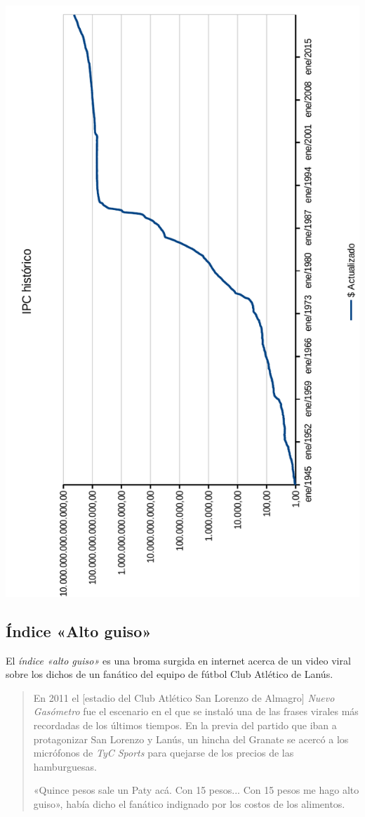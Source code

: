 \documentclass[12pt,a4paper,twoside]{book}
\begin{document}
\begin{center}
\includegraphics[scale=0.975]{img/ipc-historico.pdf}
\end{center}
\newpage

\subsection{Índice «Alto guiso»}
El \textit{índice «alto guiso»} es una broma surgida en internet acerca de un video viral sobre los dichos de un fanático del equipo de fútbol Club Atlético de Lanús.

\begin{quotation}
En 2011 el [estadio del Club Atlético San Lorenzo de Almagro] \textit{Nuevo Gasómetro} fue el escenario en el que se instaló una de las frases virales más recordadas de los últimos tiempos. En la previa del partido que iban a protagonizar San Lorenzo y Lanús, un hincha del Granate se acercó a los micrófonos de \textit{TyC Sports} para quejarse de los precios de las hamburguesas.

«Quince pesos sale un Paty acá. Con 15 pesos... Con 15 pesos me hago alto guiso», había dicho el fanático indignado por los costos de los alimentos. \cite{indice-altoguiso}
\end{quotation}
\end{document}
